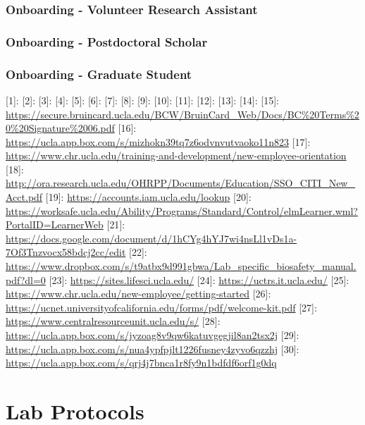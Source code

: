 \documentclass[]{book}
\begin{document}
\hypertarget{onboarding---volunteer-research-assistant}{%
\subsection{Onboarding - Volunteer Research Assistant}\label{onboarding---volunteer-research-assistant}}

\hypertarget{onboarding---postdoctoral-scholar}{%
\subsection{Onboarding - Postdoctoral Scholar}\label{onboarding---postdoctoral-scholar}}

\hypertarget{onboarding---graduate-student}{%
\subsection{Onboarding - Graduate Student}\label{onboarding---graduate-student}}

{[}1{]}:
{[}2{]}:
{[}3{]}:
{[}4{]}:
{[}5{]}:
{[}6{]}:
{[}7{]}:
{[}8{]}:
{[}9{]}:
{[}10{]}:
{[}11{]}:
{[}12{]}:
{[}13{]}:
{[}14{]}:
{[}15{]}: \url{https://secure.bruincard.ucla.edu/BCW/BruinCard_Web/Docs/BC\%20Terms\%20\%20Signature\%2006.pdf}
{[}16{]}: \url{https://ucla.app.box.com/s/mizhokn39tq7z6odvnvutvaoko11n823}
{[}17{]}: \url{https://www.chr.ucla.edu/training-and-development/new-employee-orientation}
{[}18{]}: \url{http://ora.research.ucla.edu/OHRPP/Documents/Education/SSO_CITI_New_Acct.pdf}
{[}19{]}: \url{https://accounts.iam.ucla.edu/lookup}
{[}20{]}: \url{https://worksafe.ucla.edu/Ability/Programs/Standard/Control/elmLearner.wml?PortalID=LearnerWeb}
{[}21{]}: \url{https://docs.google.com/document/d/1hCYg4hYJ7wi4nsLl1vDs1a-7Of3Tnzvocx58bdcj2cc/edit}
{[}22{]}: \url{https://www.dropbox.com/s/t9atbx9d991gbwa/Lab_specific_biosafety_manual.pdf?dl=0}
{[}23{]}: \url{https://sites.lifesci.ucla.edu/}
{[}24{]}: \url{https://uctrs.it.ucla.edu/}
{[}25{]}: \url{https://www.chr.ucla.edu/new-employee/getting-started}
{[}26{]}: \url{https://ucnet.universityofcalifornia.edu/forms/pdf/welcome-kit.pdf}
{[}27{]}: \url{https://www.centralresourceunit.ucla.edu/s/}
{[}28{]}: \url{https://ucla.app.box.com/s/jyzoag8v9qw6katuvgegjil8an2tsx2j}
{[}29{]}: \url{https://ucla.app.box.com/s/nua4ypfpjlt1226fusney4zyvo6qzzhj}
{[}30{]}: \url{https://ucla.app.box.com/s/qrj4j7bnca1r8fy9n1bdfdf6orf1g0dq}

\hypertarget{lab-protocols}{%
\chapter{Lab Protocols}\label{lab-protocols}}
\end{document}

